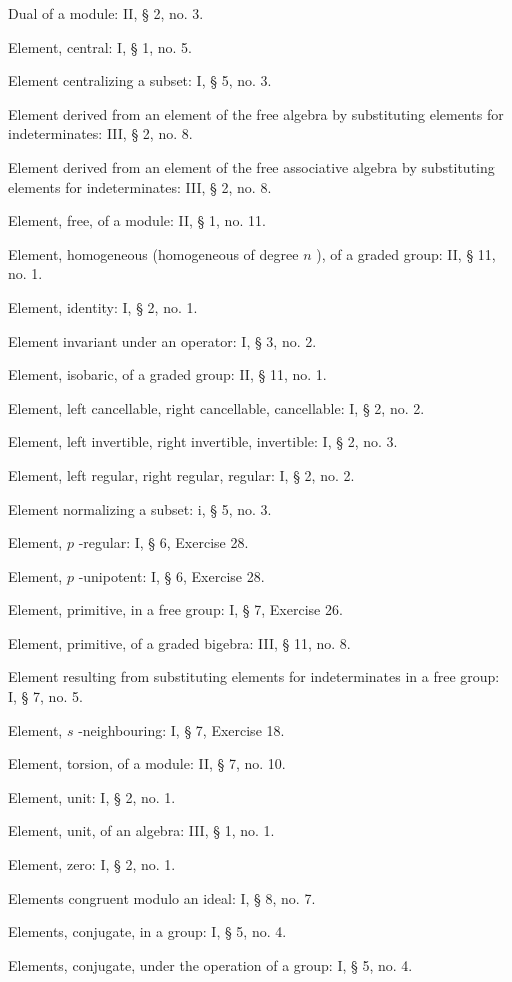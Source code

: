Dual of a module: II, § 2, no. 3.

Element, central: I, § 1, no. 5.

Element centralizing a subset: I, § 5, no. 3.

Element derived from an element of the free algebra by substituting elements for indeterminates: III, § 2, no. 8.

Element derived from an element of the free associative algebra by substituting elements for indeterminates: III, § 2, no. 8.

Element, free, of a module: II, § 1, no. 11.

Element, homogeneous (homogeneous of degree \(n\) ), of a graded group: II, § 11, no. 1.

Element, identity: I, § 2, no. 1.

Element invariant under an operator: I, § 3, no. 2.

Element, isobaric, of a graded group: II, § 11, no. 1.

Element, left cancellable, right cancellable, cancellable: I, § 2, no. 2.

Element, left invertible, right invertible, invertible: I, § 2, no. 3.

Element, left regular, right regular, regular: I, § 2, no. 2.

Element normalizing a subset: i, § 5, no. 3.

Element, \(p\) -regular: I, § 6, Exercise 28.

Element, \(p\) -unipotent: I, § 6, Exercise 28.

Element, primitive, in a free group: I, § 7, Exercise 26.

Element, primitive, of a graded bigebra: III, § 11, no. 8.

Element resulting from substituting elements for indeterminates in a free group: I, § 7, no. 5.

Element, \(s\) -neighbouring: I, § 7, Exercise 18.

Element, torsion, of a module: II, § 7, no. 10.

Element, unit: I, § 2, no. 1.

Element, unit, of an algebra: III, § 1, no. 1.

Element, zero: I, § 2, no. 1.

Elements congruent modulo an ideal: I, § 8, no. 7.

Elements, conjugate, in a group: I, § 5, no. 4.

Elements, conjugate, under the operation of a group: I, § 5, no. 4.

